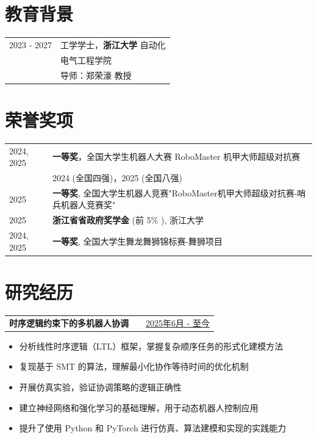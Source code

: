 \documentclass[a4paper,12pt]{article}
\makeatletter
\newenvironment{joblong}[2]
    {
    \begin{tabularx}{\linewidth}{@{}l X r@{}}
    \textbf{#1} & \hfill &  #2 \\[3.75pt]
    \end{tabularx}
    \begin{minipage}[t]{\linewidth}
    \begin{itemize}[nosep,after=\strut, leftmargin=1em, itemsep=3pt,label=--]
    }
    {
    \end{itemize}
    \end{minipage}    
    }
\makeatother
\begin{document}
\section{教育背景}
\begin{tabularx}{\linewidth}{@{}l X@{}}	
2023 - 2027 & 工学学士，\textbf{浙江大学} 自动化 \hfill \normalsize \\
& 电气工程学院 \\
& 导师：郑荣濠 教授 \\
\end{tabularx}

\section{荣誉奖项}
\begin{tabularx}{\linewidth}{@{}l X@{}}
2024, 2025 & \textbf{一等奖}，全国大学生机器人大赛 RoboMaster 机甲大师超级对抗赛 \\
& 2024 (全国四强)，2025 (全国八强) \\[3.75pt]
2025 & \textbf{一等奖}, 全国大学生机器人竞赛"RoboMaster机甲大师超级对抗赛-哨兵机器人竞赛奖" \\[3.75pt]
2025 & \textbf{浙江省省政府奖学金} (前 5\% ), 浙江大学 \\
2024, 2025 & \textbf{一等奖}, 全国大学生舞龙舞狮锦标赛-舞狮项目 \\[3.75pt]
\end{tabularx}

\section{研究经历}

\begin{joblong}{时序逻辑约束下的多机器人协调}{\href{https://vamperd.github.io/research/}{2025年6月 - 至今}}
\item 分析线性时序逻辑（LTL）框架，掌握复杂顺序任务的形式化建模方法
\item 复现基于 SMT 的算法，理解最小化协作等待时间的优化机制
\item 开展仿真实验，验证协调策略的逻辑正确性
\item 建立神经网络和强化学习的基础理解，用于动态机器人控制应用
\item 提升了使用 Python 和 PyTorch 进行仿真、算法建模和实现的实践能力
\end{joblong}
\end{document}
